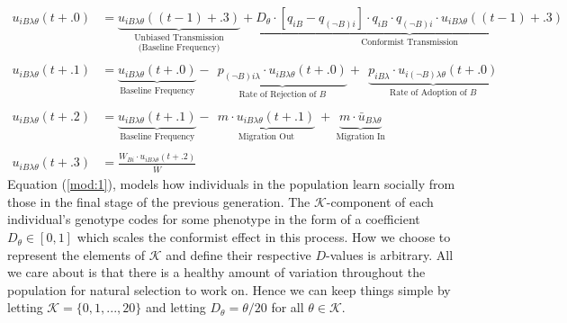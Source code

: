 \documentclass[a4paper,8pt]{extarticle}
\begin{document}
\begin{align}
    u_{iB\lambda\theta}(t+.0)
    &=\underset{\text{(Baseline Frequency)}}{\underbrace{u_{iB\lambda\theta}((t-1)+.3)}_{\text{Unbiased Transmission}}}
    +\underbrace{
        D_\theta
        \cdot [q_{iB}-q_{(\lnot B)i}]
        \cdot q_{iB}
        \cdot q_{(\lnot B)i}
        \cdot u_{iB\lambda\theta}((t-1)+.3)}_{\text{Conformist Transmission}
    }
    \label{mod:1}
    \\
    \nonumber
    \\
    u_{iB\lambda\theta}(t+.1)
    &=
    \underbrace{u_{iB\lambda\theta}(t+.0)}_{\text{Baseline Frequency}}
    -\ \ 
    \underbrace{
        p_{(\lnot B)i\lambda}
        \cdot u_{iB\lambda\theta}(t+.0)
    }
    _{\text{Rate of Rejection of $B$}}
    +\ \ 
    \underbrace{
        p_{iB\lambda}
        \cdot u_{i(\lnot B)\lambda\theta}(t+.0)
    }
    _{\text{Rate of Adoption of $B$}}
    \label{mod:2}
    \\
    \nonumber
    \\
    u_{iB\lambda\theta}(t+.2)
    &=
    \underbrace{
        u_{iB\lambda\theta}(t+.1)
    }
    _{\text{Baseline Frequency}}
    -\ \ 
    \underbrace{
        m
        \cdot u_{iB\lambda\theta}(t+.1)
    }
    _{\text{Migration Out}}
    \ + \ 
    \underbrace{
        m
        \cdot\bar u_{B\lambda\theta}
    }
    _{\text{Migration In}}
    \label{mod:3}
    \\
    \nonumber
    \\
    u_{iB\lambda\theta}(t+.3)
    &=\frac{
        W_{Bi}
        \cdot u_{iB\lambda\theta}(t+.2)
    }{
        \overline W
    }
    \label{mod:4}
\end{align}
Equation (\ref {mod:1}), models how individuals in the population learn socially from those in the final stage of the previous generation. The $\mathcal K$-component of each individual's genotype codes for some phenotype in the form of a coefficient $D_\theta\in[0,1]$ which scales the conformist effect in this process. How we choose to represent the elements of $\mathcal K$ and define their respective $D$-values is arbitrary. All we care about is that there is a healthy amount of variation throughout the population for natural selection to work on. Hence we can keep things simple by letting \mbox{$\mathcal K=\{0,1,...,20\}$} and letting $D_\theta=\theta/20$ for all $\theta\in\mathcal K$.
\end{document}
